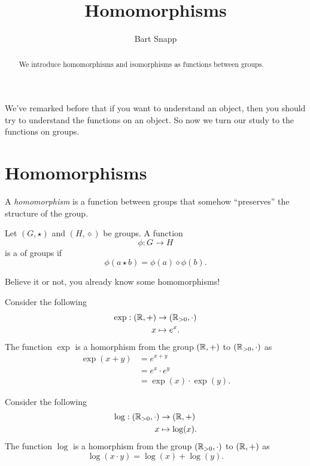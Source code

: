 \documentclass{ximera}
\author{Bart Snapp}
\title{Homomorphisms}
\begin{document}
\begin{abstract}
  We introduce homomorphisms and isomorphisms as functions between
  groups.
\end{abstract}
\maketitle

We've remarked before that if you want to understand an object, then
you should try to understand the functions on an object. So now we
turn our study to the functions on groups.


\section{Homomorphisms}


A \textit{homomorphism} is a function between groups that somehow
``preserves'' the structure of the group.


\begin{definition}
  Let $(G,\star)$ and $(H,\diamond)$ be groups. A function
  \[
  \phi:G\to H
  \]
  is a  of groups if
  \[
  \phi(a\star b) = \phi(a)\diamond\phi(b).
  \]
\end{definition}

Believe it or not, you already know some homomorphisms!

\begin{example}\label{EG:exp}
  Consider the following
  \begin{align*}
    \exp:(\mathbb R,+) &\to (\mathbb R_{> 0},\cdot) \\
    x &\mapsto e^x.
  \end{align*}
  The function $\exp$ is a homorphism from the group $(\mathbb R,+)$ to
  $(\mathbb R_{> 0},\cdot)$ as
  \begin{align*}
    \exp(x+y) &= e^{x+y} \\
    &= e^x \cdot e^y\\
    &= \exp(x)\cdot \exp(y).
  \end{align*}
\end{example}



\begin{example}\label{EG:log}
  Consider the following
  \begin{align*}
    \log:(\mathbb R_{> 0},\cdot) &\to (\mathbb R,+)\\
    x &\mapsto \log(x).
  \end{align*}
  The function $\log$ is a homorphism from the group $(\mathbb R_{> 0},\cdot)$ to $(\mathbb R,+)$ as
  \[
  \log(x\cdot y) = \log(x) + \log(y).
  \]
\end{example}
\end{document}
